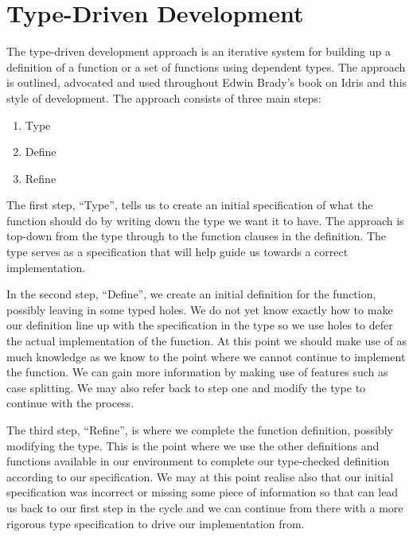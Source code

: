 \documentclass[a4paper, notitlepage]{report}
\begin{document}
\section{Type-Driven Development}
\label{sec:orgd66194b}
The type-driven development approach is an iterative system for building up a
definition of a function or a set of functions using dependent types. The
approach is outlined, advocated and used throughout Edwin Brady's book
\cite{brady_book_2017} on Idris and this style of development. The approach
consists of three main steps:
\begin{enumerate}
\item Type
\item Define
\item Refine
\end{enumerate}

The first step, ``Type'', tells us to create an initial specification of what
the function should do by writing down the type we want it to have. The approach
is top-down from the type through to the function clauses in the definition. The
type serves as a specification that will help guide us towards a correct
implementation.

In the second step, ``Define'', we create an initial definition for the
function, possibly leaving in some typed holes. We do not yet know exactly how
to make our definition line up with the specification in the type so we use
holes to defer the actual implementation of the function. At this point we
should make use of as much knowledge as we know to the point where we cannot
continue to implement the function. We can gain more information by making use
of features such as case splitting. We may also refer back to step one and
modify the type to continue with the process.

The third step, ``Refine'', is where we complete the function definition,
possibly modifying the type. This is the point where we use the other
definitions and functions available in our environment to complete our
type-checked definition according to our specification. We may at this point
realise also that our initial specification was incorrect or missing some piece
of information so that can lead us back to our first step in the cycle and we
can continue from there with a more rigorous type specification to drive our
implementation from.
\end{document}
